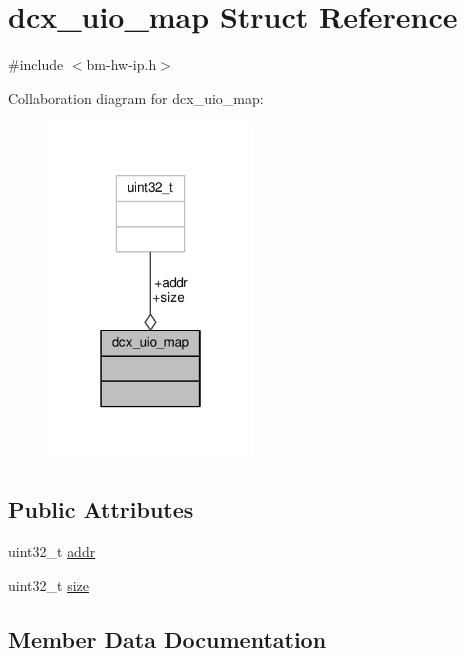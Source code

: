 \hypertarget{structdcx__uio__map}{}\section{dcx\+\_\+uio\+\_\+map Struct Reference}
\label{structdcx__uio__map}


{\ttfamily \#include $<$bm-\/hw-\/ip.\+h$>$}



Collaboration diagram for dcx\+\_\+uio\+\_\+map\+:
\nopagebreak
\begin{figure}[H]
\begin{center}
\leavevmode
\includegraphics[width=154pt]{structdcx__uio__map__coll__graph}
\end{center}
\end{figure}
\subsection*{Public Attributes}
\begin{DoxyCompactItemize}
\item 
uint32\+\_\+t \hyperlink{structdcx__uio__map_a73ce78a039ea5795df6c831b8e011289}{addr}
\item 
uint32\+\_\+t \hyperlink{structdcx__uio__map_aa79438031223dcae6e71bebdc58ee8f3}{size}
\end{DoxyCompactItemize}


\subsection{Member Data Documentation}
